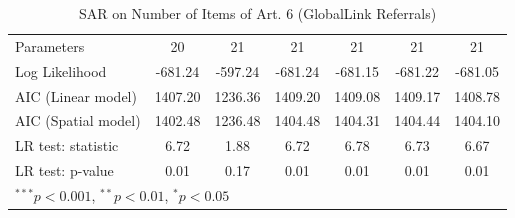 \begin{table}[!h]
\begin{center}
\begin{tabular}{l c c c c c c }
Parameters              & 20           & 21           & 21           & 21           & 21           & 21           \\
Log Likelihood          & -681.24      & -597.24      & -681.24      & -681.15      & -681.22      & -681.05      \\
AIC (Linear model)      & 1407.20      & 1236.36      & 1409.20      & 1409.08      & 1409.17      & 1408.78      \\
AIC (Spatial model)     & 1402.48      & 1236.48      & 1404.48      & 1404.31      & 1404.44      & 1404.10      \\
LR test: statistic      & 6.72         & 1.88         & 6.72         & 6.78         & 6.73         & 6.67         \\
LR test: p-value        & 0.01         & 0.17         & 0.01         & 0.01         & 0.01         & 0.01         \\
\bottomrule
\multicolumn{7}{l}{\scriptsize{$^{***}p<0.001$, $^{**}p<0.01$, $^*p<0.05$}}
\end{tabular}
\caption{SAR on Number of Items of Art. 6 (GlobalLink Referrals)}
\label{table:coefficients}
\end{center}
\end{table}

